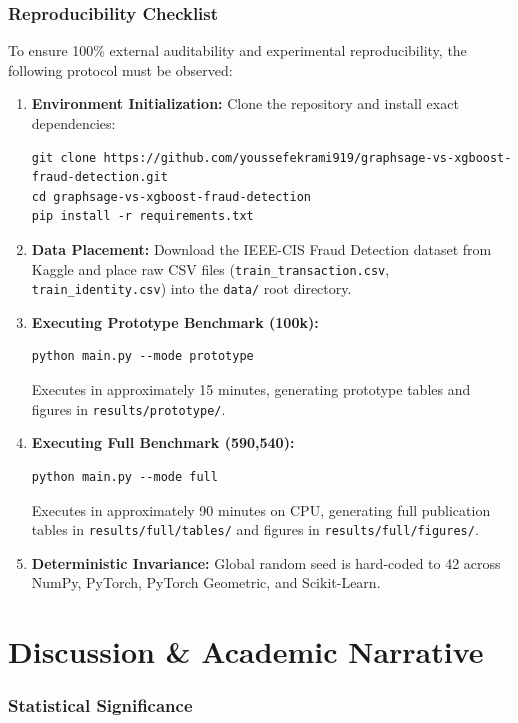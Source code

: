 \documentclass[11pt,a4paper]{report}
\begin{document}
\section{Reproducibility Checklist}
To ensure 100\% external auditability and experimental reproducibility, the following protocol must be observed:
\begin{enumerate}
    \item \textbf{Environment Initialization:} Clone the repository and install exact dependencies:
    \begin{verbatim}
git clone https://github.com/youssefekrami919/graphsage-vs-xgboost-fraud-detection.git
cd graphsage-vs-xgboost-fraud-detection
pip install -r requirements.txt
    \end{verbatim}
    \item \textbf{Data Placement:} Download the IEEE-CIS Fraud Detection dataset from Kaggle and place raw CSV files (\texttt{train\_transaction.csv}, \texttt{train\_identity.csv}) into the \texttt{data/} root directory.
    \item \textbf{Executing Prototype Benchmark (100k):}
    \begin{verbatim}
python main.py --mode prototype
    \end{verbatim}
    Executes in approximately 15 minutes, generating prototype tables and figures in \texttt{results/prototype/}.
    \item \textbf{Executing Full Benchmark (590,540):}
    \begin{verbatim}
python main.py --mode full
    \end{verbatim}
    Executes in approximately 90 minutes on CPU, generating full publication tables in \texttt{results/full/tables/} and figures in \texttt{results/full/figures/}.
    \item \textbf{Deterministic Invariance:} Global random seed is hard-coded to 42 across NumPy, PyTorch, PyTorch Geometric, and Scikit-Learn.
\end{enumerate}

\part{Discussion \& Academic Narrative}

\section{Statistical Significance}
\end{document}
